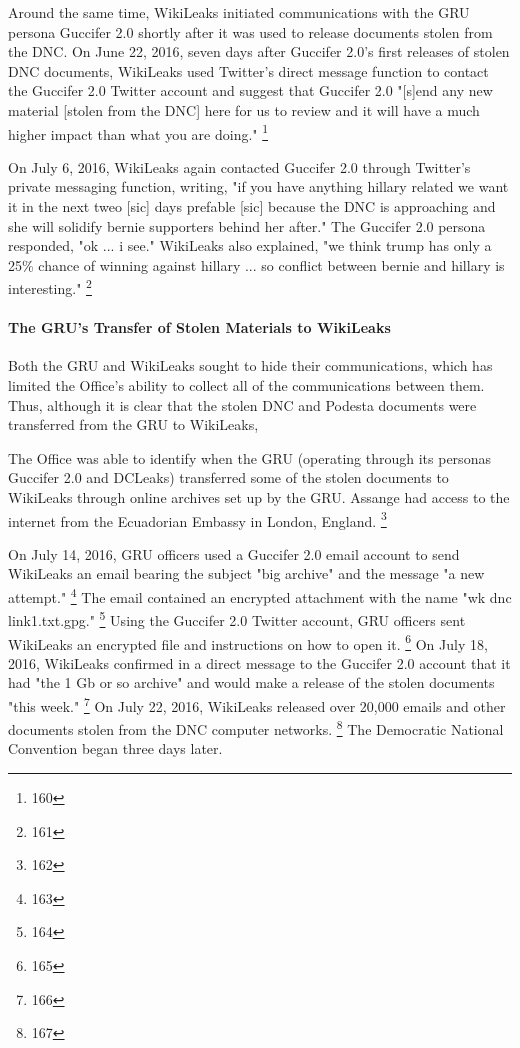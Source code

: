 Around the same time, WikiLeaks initiated communications with the GRU persona Guccifer 2.0 shortly after it was used to release documents stolen from the DNC.
On June 22, 2016, seven days after Guccifer 2.0's first releases of stolen DNC documents, WikiLeaks used Twitter's direct message function to contact the Guccifer 2.0 Twitter account and suggest that Guccifer 2.0 "[s]end any new material [stolen from the DNC] here for us to review and it will have a much higher impact than what you are doing."%
\footnote{160}

On July 6, 2016, WikiLeaks again contacted Guccifer 2.0 through Twitter's private messaging function, writing, "if you have anything hillary related we want it in the next tweo [sic] days prefable [sic] because the DNC is approaching and she will solidify bernie supporters behind her after."
The Guccifer 2.0 persona responded, "ok ... i see."
WikiLeaks also explained, "we think trump has only a 25\% chance of winning against hillary ... so conflict between bernie and hillary is interesting."%
\footnote{161}

\paragraph{The GRU's Transfer of Stolen Materials to WikiLeaks}

Both the GRU and WikiLeaks sought to hide their communications, which has limited the Office's ability to collect all of the communications between them.
Thus, although it is clear that the stolen DNC and Podesta documents were transferred from the GRU to WikiLeaks, 

The Office was able to identify when the GRU (operating through its personas Guccifer 2.0 and DCLeaks) transferred some of the stolen documents to WikiLeaks through online archives set up by the GRU.
Assange had access to the internet from the Ecuadorian Embassy in London, England.
\footnote{162}

On July 14, 2016, GRU officers used a Guccifer 2.0 email account to send WikiLeaks an email bearing the subject "big archive" and the message "a new attempt."%
\footnote{163}
The email contained an encrypted attachment with the name "wk dnc link1.txt.gpg."%
\footnote{164}
Using the Guccifer 2.0 Twitter account, GRU officers sent WikiLeaks an encrypted file and instructions on how to open it.%
\footnote{165}
On July 18, 2016, WikiLeaks confirmed in a direct message to the Guccifer 2.0 account that it had "the 1 Gb or so archive" and would make a release of the stolen documents "this week."%
\footnote{166}
On July 22, 2016, WikiLeaks released over 20,000 emails and other documents stolen from the DNC computer networks.%
\footnote{167}
The Democratic National Convention began three days later.

